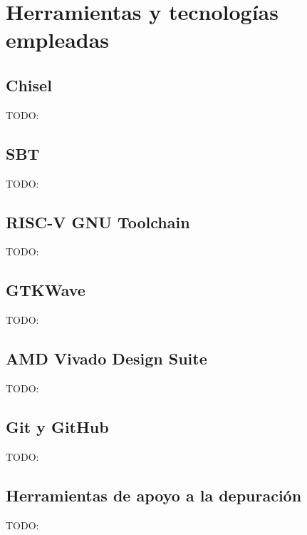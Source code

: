 \chapter{Herramientas y tecnologías empleadas}

\section{Chisel}

TODO:

\section{SBT}

TODO:

\section{RISC-V GNU Toolchain}

TODO:

\section{GTKWave}

TODO:

\section{AMD Vivado Design Suite}

TODO:

\section{Git y GitHub}

TODO:

\section{Herramientas de apoyo a la depuración}

TODO: